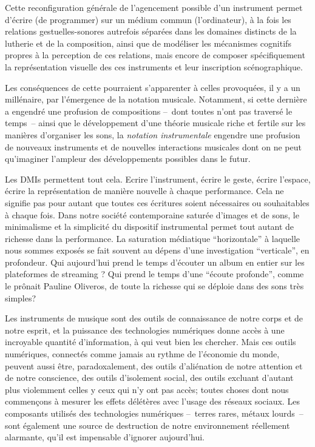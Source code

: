 \noindent Cette reconfiguration générale de l'agencement possible d'un instrument permet d'écrire (de programmer) sur un médium commun (l'ordinateur), à la fois les relations gestuelles-sonores autrefois séparées dans les domaines distincts de la lutherie et de la composition, ainsi que de modéliser les mécanismes cognitifs propres à la perception de ces relations, mais encore de composer spécifiquement la représentation visuelle des ces instruments et leur inscription scénographique. 


Les conséquences de cette  pourraient s'apparenter à celles provoquées, il y a un millénaire, par l'émergence de la notation musicale. Notamment, si cette dernière a engendré une profusion de compositions --~dont toutes n'ont pas traversé le temps~-- ainsi que le développement d'une théorie musicale riche et fertile sur les manières d'organiser les sons, la \textit{notation instrumentale} engendre une profusion de nouveaux instruments et de nouvelles interactions musicales dont on ne peut qu'imaginer l'ampleur des développements possibles dans le futur.


Les \glspl{DMI} permettent tout cela. Ecrire l'instrument, écrire le geste, écrire l'espace, écrire la représentation de manière nouvelle à chaque performance. Cela ne signifie pas pour autant que toutes ces écritures soient nécessaires ou souhaitables à chaque fois. Dans notre société contemporaine saturée d'images et de sons, le minimalisme et la simplicité du dispositif instrumental permet tout autant de richesse dans la performance. La saturation médiatique ``horizontale'' à laquelle nous sommes exposés se fait souvent au dépens d'une investigation ``verticale'', en profondeur. Qui aujourd'hui prend le temps d'écouter un album en entier sur les plateformes de streaming ? Qui prend le temps d'une ``écoute profonde'', comme le prônait Pauline Oliveros, de toute la richesse qui se déploie dans des sons très simples?

Les instruments de musique sont des outils de connaissance de notre corps et de notre esprit, et la puissance des technologies numériques donne accès à une incroyable quantité d'information, à qui veut bien les chercher. Mais ces outils numériques, connectés comme jamais au rythme de l'économie du monde, peuvent aussi être, paradoxalement, des outils d'aliénation de notre attention et de notre conscience, des outils d'isolement social, des outils excluant d'autant plus violemment celles y ceux qui n'y ont pas accès; toutes choses dont nous commençons à mesurer les effets délétères avec l'usage des réseaux sociaux. Les composants utilisés des technologies numériques --~terres rares, métaux lourds~-- sont également une source de destruction de notre environnement réellement alarmante, qu'il est impensable d'ignorer aujourd'hui.

